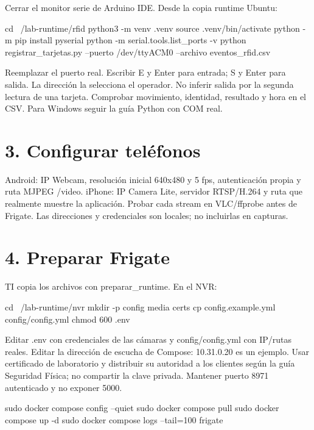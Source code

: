 \documentclass[12pt,a4paper]{article}
\begin{document}
Cerrar el monitor serie de Arduino IDE. Desde la copia runtime Ubuntu:\par
{}
\begin{Comandos}
cd ~/lab-runtime/rfid
python3 -m venv .venv
source .venv/bin/activate
python -m pip install pyserial
python -m serial.tools.list_ports -v
python registrar_tarjetas.py --puerto /dev/ttyACM0 --archivo eventos_rfid.csv
\end{Comandos}
Reemplazar el puerto real. Escribir E y Enter para entrada; S y Enter para salida. La dirección la selecciona el operador. No inferir salida por la segunda lectura de una tarjeta. Comprobar movimiento, identidad, resultado y hora en el CSV. Para Windows seguir la guía Python con COM real.\par
{}\section*{3. Configurar teléfonos}
Android: IP Webcam, resolución inicial 640x480 y 5 fps, autenticación propia y ruta MJPEG \textnormal{/\allowbreak{}video}. iPhone: IP Camera Lite, servidor RTSP/H.264 y ruta que realmente muestre la aplicación. Probar cada stream en VLC/ffprobe antes de Frigate. Las direcciones y credenciales son locales; no incluirlas en capturas.\par
{}\section*{4. Preparar Frigate}
TI copia los archivos con preparar\_runtime. En el NVR:\par
{}
\begin{Comandos}
cd ~/lab-runtime/nvr
mkdir -p config media certs
cp config.example.yml config/config.yml
chmod 600 .env
\end{Comandos}
Editar \textnormal{.env} con credenciales de las cámaras y \textnormal{config/\allowbreak{}config.yml} con IP/rutas reales. Editar la dirección de escucha de Compose: 10.31.0.20 es un ejemplo. Usar certificado de laboratorio y distribuir su autoridad a los clientes según la guía Seguridad Física; no compartir la clave privada. Mantener puerto 8971 autenticado y no exponer 5000.\par
{}
\begin{Comandos}
sudo docker compose config --quiet
sudo docker compose pull
sudo docker compose up -d
sudo docker compose logs --tail=100 frigate
\end{Comandos}
\end{document}
